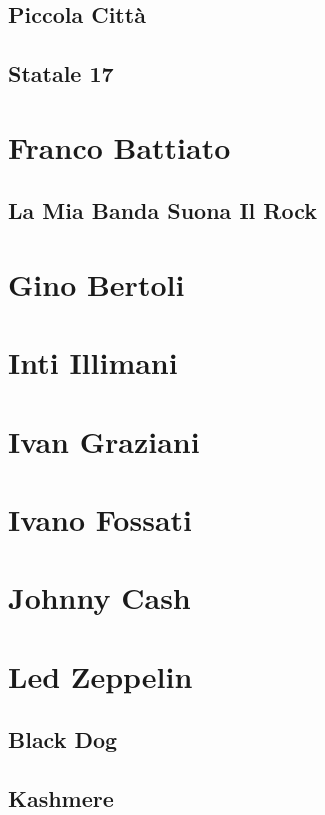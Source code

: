 \section{Piccola Città}
\section{Statale 17}

\chapter{Franco Battiato}
\section{La Mia Banda Suona Il Rock}

\chapter{Gino Bertoli}

\chapter{Inti Illimani}

\chapter{Ivan Graziani}

\chapter{Ivano Fossati}

\chapter{Johnny Cash}

\chapter{Led Zeppelin}
\section{Black Dog}
\section{Kashmere}

